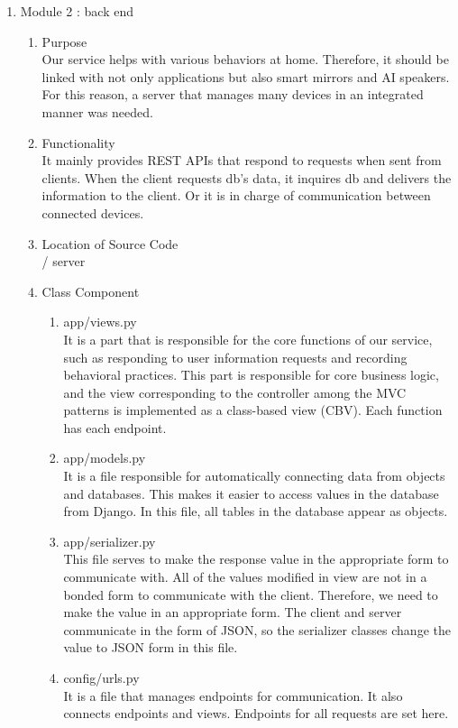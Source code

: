 \documentclass[11pt, conference]{IEEEtran}
\begin{document}
\begin{enumerate}[label=\arabic*]
    \item {\large{Module 2 : back end}}
    \begin{enumerate}[label=\alph*]
        \item Purpose\\
        Our service helps with various behaviors at home. Therefore, it should be linked with not only applications but also smart mirrors and AI speakers. For this reason, a server that manages many devices in an integrated manner was needed.
        \item Functionality\\
        It mainly provides REST APIs that respond to requests when sent from clients. When the client requests db's data, it inquires db and delivers the information to the client. Or it is in charge of communication between connected devices.
        \item Location of Source Code\\
        / server
        \item Class Component
        \begin{enumerate}
            \item app/views.py\\
            It is a part that is responsible for the core functions of our service, such as responding to user information requests and recording behavioral practices. This part is responsible for core business logic, and the view corresponding to the controller among the MVC patterns is implemented as a class-based view (CBV). Each function has each endpoint.
            \item app/models.py\\
            It is a file responsible for automatically connecting data from objects and databases. This makes it easier to access values in the database from Django. In this file, all tables in the database appear as objects.
            \item app/serializer.py\\
            This file serves to make the response value in the appropriate form to communicate with. All of the values modified in view are not in a bonded form to communicate with the client. Therefore, we need to make the value in an appropriate form. The client and server communicate in the form of JSON, so the serializer classes change the value to JSON form in this file.
            \item config/urls.py\\
            It is a file that manages endpoints for communication. It also connects endpoints and views. Endpoints for all requests are set here.

\end{enumerate}
\end{enumerate}
\end{enumerate}
\end{document}
